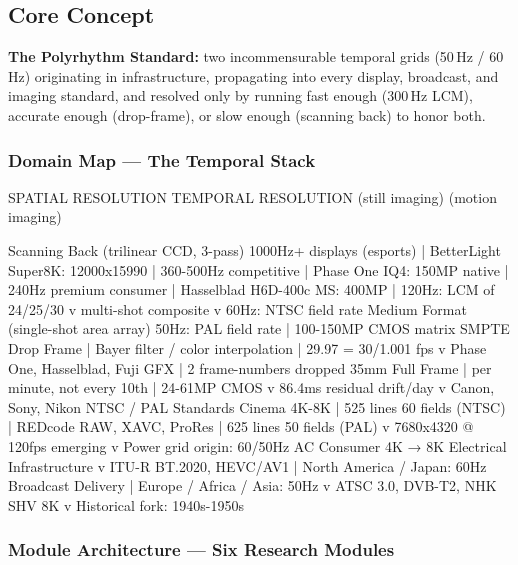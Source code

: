 \documentclass[11pt,letterpaper]{article}
\begin{document}
\subsection{Core Concept}

\textbf{The Polyrhythm Standard:} two incommensurable temporal grids (50\,Hz / 60\,Hz) originating in
infrastructure, propagating into every display, broadcast, and imaging standard, and resolved only by
running fast enough (300\,Hz LCM), accurate enough (drop-frame), or slow enough (scanning back) to
honor both.

\subsubsection{Domain Map --- The Temporal Stack}

\begin{asciibox}
  SPATIAL RESOLUTION                         TEMPORAL RESOLUTION
  (still imaging)                            (motion imaging)
  
  Scanning Back (trilinear CCD, 3-pass)      1000Hz+ displays (esports)
    |  BetterLight Super8K: 12000x15990       |  360-500Hz competitive
    |  Phase One IQ4: 150MP native            |  240Hz premium consumer
    |  Hasselblad H6D-400c MS: 400MP          |  120Hz: LCM of 24/25/30
    v  multi-shot composite                   v  60Hz: NTSC field rate
  Medium Format (single-shot area array)        50Hz: PAL field rate
    |  100-150MP CMOS matrix                SMPTE Drop Frame
    |  Bayer filter / color interpolation     |  29.97 = 30/1.001 fps
    v  Phase One, Hasselblad, Fuji GFX        |  2 frame-numbers dropped
  35mm Full Frame                               |  per minute, not every 10th
    |  24-61MP CMOS                           v  86.4ms residual drift/day
    v  Canon, Sony, Nikon                   NTSC / PAL Standards
  Cinema 4K-8K                               |  525 lines 60 fields (NTSC)
    |  REDcode RAW, XAVC, ProRes              |  625 lines 50 fields (PAL)
    v  7680x4320 @ 120fps emerging            v  Power grid origin: 60/50Hz AC
  Consumer 4K → 8K                         Electrical Infrastructure
    v  ITU-R BT.2020, HEVC/AV1              |  North America / Japan: 60Hz
  Broadcast Delivery                         |  Europe / Africa / Asia: 50Hz
    v  ATSC 3.0, DVB-T2, NHK SHV 8K        v  Historical fork: 1940s-1950s
\end{asciibox}

\subsubsection{Module Architecture --- Six Research Modules}
\end{document}
